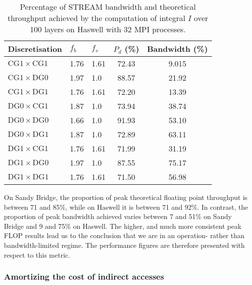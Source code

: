 \documentclass[11pt, a4paper]{scrartcl}
\begin{document}
\begin{table}[htbp]
  \centering
  \begin{tabular}{l|l|l|c|c}
    Discretisation                      & $f_{b}$ & $f_{v}$ & $P_{d}$ (\%) & Bandwidth (\%) \\
    \hline
    $\mathrm{CG1} \times \mathrm{CG1}$ & 1.76    & 1.61    & 72.43        & 9.015          \\
    $\mathrm{CG1} \times \mathrm{DG0}$ & 1.97    & 1.0     & 88.57        & 21.92          \\
    $\mathrm{CG1} \times \mathrm{DG1}$ & 1.76    & 1.61    & 72.20        & 13.39          \\
    $\mathrm{DG0} \times \mathrm{CG1}$ & 1.87    & 1.0     & 73.94        & 38.74          \\
    $\mathrm{DG0} \times \mathrm{DG0}$ & 1.66    & 1.0     & 91.93        & 53.10          \\
    $\mathrm{DG0} \times \mathrm{DG1}$ & 1.87    & 1.0     & 72.89        & 63.11          \\
    $\mathrm{DG1} \times \mathrm{CG1}$ & 1.76    & 1.61    & 71.99        & 31.19          \\
    $\mathrm{DG1} \times \mathrm{DG0}$ & 1.97    & 1.0     & 87.55        & 75.17          \\
    $\mathrm{DG1} \times \mathrm{DG1}$ & 1.76    & 1.61    & 71.50        & 56.98          \\
  \end{tabular}
  \caption{Percentage of STREAM bandwidth and theoretical throughput
    achieved by the computation of integral $I$ over 100 layers on
    Haswell with 32 MPI processes.\label{tab:haswell-percentage-peak}}
\end{table}

On Sandy Bridge, the proportion of peak theoretical floating point
throughput is between 71 and 85\%, while on Haswell it is between 71
and 92\%.  In contrast, the proportion of peak bandwidth achieved
varies between 7 and 51\% on Sandy Bridge and 9 and 75\% on Haswell.
The higher, and much more consistent peak FLOP results lead us to the
conclusion that we are in an operation- rather than bandwidth-limited
regime.  The performance figures are therefore presented with respect
to this metric.

\subsubsection{Amortizing the cost of indirect accesses}
\label{sssec:amortizing-indirect}
\end{document}
